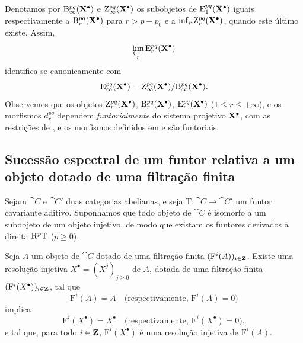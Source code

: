 \begin{env}[13.5.7]
\label{0.13.5.7}
Denotamos por
$\mathrm{B}_\infty^{pq}(\mathbf{X}^\bullet)$ e
$\mathrm{Z}_\infty^{pq}(\mathbf{X}^\bullet)$ os subobjetos de
$\mathrm{E}_1^{pq}(\mathbf{X}^\bullet)$ iguais respectivamente a
$\mathrm{B}_r^{pq}(\mathbf{X}^\bullet)$ para $r>p-p_0$ e a
$\inf_r\mathrm{Z}_r^{pq}(\mathbf{X}^\bullet)$, quando este último existe.
Assim,
\[
  \varprojlim_r\mathrm{E}_r^{pq}(\mathbf{X}^\bullet)
\]
identifica-se canonicamente com
\[
  \mathrm{E}_\infty^{pq}(\mathbf{X}^\bullet)
  =
  \mathrm{Z}_\infty^{pq}(\mathbf{X}^\bullet)/
  \mathrm{B}_\infty^{pq}(\mathbf{X}^\bullet).
\]
Observemos que os objetos
$\mathrm{Z}_r^{pq}(\mathbf{X}^\bullet)$,
$\mathrm{B}_r^{pq}(\mathbf{X}^\bullet)$,
$\mathrm{E}_r^{pq}(\mathbf{X}^\bullet)$
($1\leq r\leq+\infty$), e os morfismos $d_r^{pq}$ dependem
\emph{funtorialmente} do sistema projetivo $\mathbf{X}^\bullet$, com as
restrições de , e os morfismos definidos em
 e  são funtoriais.
\end{env}

\subsection{Sucessão espectral de um funtor relativa a um objeto dotado de uma filtração finita}
\label{subsection:0.13.6}

\begin{env}[13.6.1]
\label{0.13.6.1}
Sejam $\cat{C}$ e $\cat{C}'$ duas categorias abelianas, e seja
$\mathrm{T}:\cat{C}\longrightarrow\cat{C}'$ um funtor covariante
aditivo.
Suponhamos que todo objeto de $\cat{C}$ é isomorfo a um subobjeto de
um objeto injetivo, de modo que existam os funtores derivados à direita
$\mathrm{R}^p\mathrm{T}$ ($p\geq0$).
\end{env}

\begin{lemma}[13.6.2]
\label{0.13.6.2}
Seja $A$ um objeto de $\cat{C}$ dotado de uma filtração finita
$(\mathrm{F}^i(A))_{i\in\mathbf{Z}}$.
Existe uma resolução injetiva
$X^\bullet=(X^j)_{j\geq0}$ de $A$, dotada de uma filtração finita
$(\mathrm{F}^i(X^\bullet))_{i\in\mathbf{Z}}$, tal que
\[
  \mathrm{F}^i(A)=A
  \quad\text{(respectivamente, }\mathrm{F}^i(A)=0\text{)}
\]
implica
\[
  \mathrm{F}^i(X^\bullet)=X^\bullet
  \quad\text{(respectivamente, }\mathrm{F}^i(X^\bullet)=0\text{)},
\]
e tal que, para todo $i\in\mathbf{Z}$,
$\mathrm{F}^i(X^\bullet)$ é uma resolução injetiva de
$\mathrm{F}^i(A)$.
\end{lemma}

